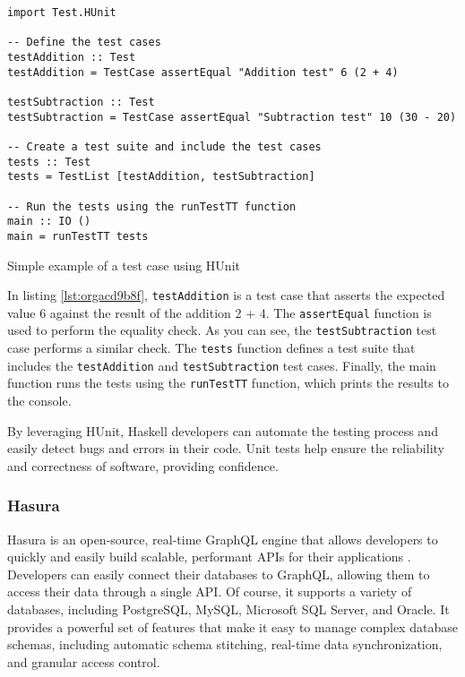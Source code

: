 \documentclass[a4paper, titlepage, twoside]{article}
\begin{document}
\begin{listing}[htbp]
\begin{verbatim}
import Test.HUnit

-- Define the test cases
testAddition :: Test
testAddition = TestCase assertEqual "Addition test" 6 (2 + 4)

testSubtraction :: Test
testSubtraction = TestCase assertEqual "Subtraction test" 10 (30 - 20)

-- Create a test suite and include the test cases
tests :: Test
tests = TestList [testAddition, testSubtraction]

-- Run the tests using the runTestTT function
main :: IO ()
main = runTestTT tests
\end{verbatim}
\caption{\label{lst:orgacd9b8f}Simple example of a test case using HUnit}
\end{listing}

In listing \ref{lst:orgacd9b8f}, \texttt{testAddition} is a test case that asserts the expected value 6 against the result of the addition 2 + 4. The \texttt{assertEqual} function is used to perform the equality check. As you can see, the \texttt{testSubtraction} test case performs a similar check. The \texttt{tests} function defines a test suite that includes the \texttt{testAddition} and \texttt{testSubtraction} test cases. Finally, the main function runs the tests using the \texttt{runTestTT} function, which prints the results to the console.

By leveraging HUnit, Haskell developers can automate the testing process and easily detect bugs and errors in their code. Unit tests help ensure the reliability and correctness of software, providing confidence.

\subsubsection{Hasura}
\label{sec:org8754700}

Hasura is an open-source, real-time GraphQL engine that allows developers to quickly and easily build scalable, performant APIs for their applications \autocite{hasuraInstantGraphQLAPIs}. Developers can easily connect their databases to GraphQL, allowing them to access their data through a single API. Of course, it supports a variety of databases, including PostgreSQL, MySQL, Microsoft SQL Server, and Oracle. It provides a powerful set of features that make it easy to manage complex database schemas, including automatic schema stitching, real-time data synchronization, and granular access control.
\end{document}

